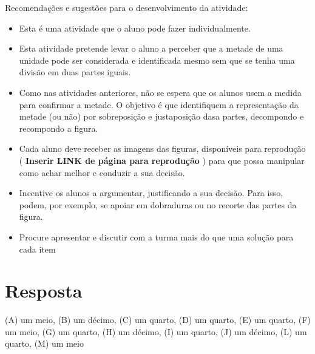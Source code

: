 \documentclass{book}
\begin{document}
  
  Recomendações e sugestões para o desenvolvimento da atividade:  
\begin{itemize} %
    \item       Esta é uma atividade que o aluno pode fazer individualmente.
    \item       Esta atividade pretende levar o aluno a perceber que a metade de uma unidade pode ser considerada e identificada mesmo sem que se tenha uma divisão em duas partes iguais. 
    \item       Como nas atividades anteriores, não se espera que os alunos usem a medida para confirmar a metade. O objetivo é que identifiquem a representação da metade (ou não) por sobreposição e justaposição dasa partes, decompondo e recompondo a figura.
    \item       Cada aluno deve receber as imagens das figuras, disponíveis para reprodução (      {\bf Inserir LINK de página para reprodução}      ) para que possa manipular como achar melhor e conduzir a sua decisão. 
    \item       Incentive os alunos a argumentar, justificando a sua decisão. Para isso, podem, por exemplo, se apoiar em dobraduras ou no recorte das partes da figura.
    \item       Procure apresentar e discutir com a turma mais do que uma solução para cada item   
\end{itemize} %
  



\section{Resposta}   (A) um meio,  (B) um décimo, (C) um quarto, (D) um quarto,  \mbox{} \newline   
  (E) um quarto, (F) um meio, (G) um quarto, (H) um décimo,  \mbox{} \newline   
  (I) um quarto, (J) um décimo, (L) um quarto, (M) um meio  
\end{document}
